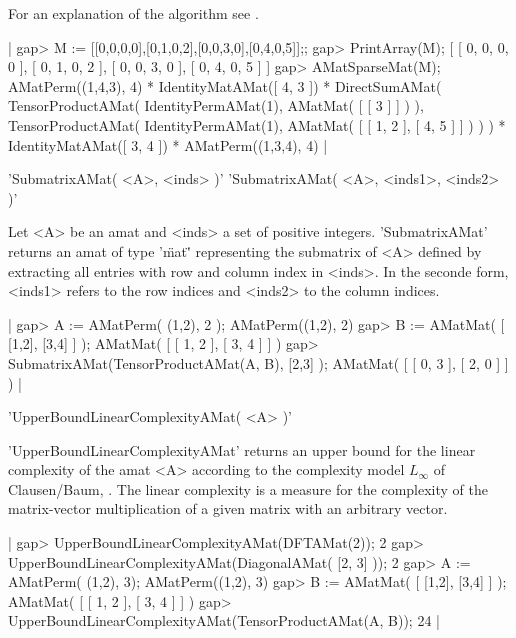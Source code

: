 For an explanation of the algorithm see \cite{Egn97}.

|    gap> M := [[0,0,0,0],[0,1,0,2],[0,0,3,0],[0,4,0,5]];; 
    gap> PrintArray(M);
    [ [  0,  0,  0,  0 ],
      [  0,  1,  0,  2 ],
      [  0,  0,  3,  0 ],
      [  0,  4,  0,  5 ] ]
    gap> AMatSparseMat(M);
    AMatPerm((1,4,3), 4) *
    IdentityMatAMat([ 4, 3 ]) *
    DirectSumAMat(
      TensorProductAMat(
        IdentityPermAMat(1),
        AMatMat(
          [ [ 3 ] ]
        )
      ),
      TensorProductAMat(
        IdentityPermAMat(1),
        AMatMat(
          [ [ 1, 2 ], [ 4, 5 ] ]
        )
      )
    ) *
    IdentityMatAMat([ 3, 4 ]) *
    AMatPerm((1,3,4), 4) |


'SubmatrixAMat( <A>, <inds> )'
'SubmatrixAMat( <A>, <inds1>, <inds2> )'

Let <A> be an amat and <inds> a set of positive integers. 
'SubmatrixAMat' returns an amat of type '\"mat\"' representing 
the submatrix of <A> defined by extracting all entries with
row and column index in <inds>. In the seconde form, <inds1>
refers to the row indices and <inds2> to the column indices.

|    gap> A := AMatPerm( (1,2), 2 );
    AMatPerm((1,2), 2)
    gap> B := AMatMat( [ [1,2], [3,4] ] );
    AMatMat(
      [ [ 1, 2 ], [ 3, 4 ] ]
    )
    gap> SubmatrixAMat(TensorProductAMat(A, B), [2,3] );
    AMatMat(
      [ [ 0, 3 ], [ 2, 0 ] ]
    ) |


'UpperBoundLinearComplexityAMat( <A> )'

'UpperBoundLinearComplexityAMat' returns an upper bound for the linear
complexity of the amat <A> according to the complexity model
$L_\infty$ of Clausen/Baum, \cite{CB93}. The linear complexity is
a measure for the complexity of the matrix-vector multiplication of a
given matrix with an arbitrary vector.

|    gap> UpperBoundLinearComplexityAMat(DFTAMat(2));
    2
    gap> UpperBoundLinearComplexityAMat(DiagonalAMat( [2, 3] ));
    2
    gap> A := AMatPerm( (1,2), 3);
    AMatPerm((1,2), 3)
    gap> B := AMatMat( [ [1,2], [3,4] ] );
    AMatMat(
      [ [ 1, 2 ], [ 3, 4 ] ]
    )
    gap> UpperBoundLinearComplexityAMat(TensorProductAMat(A, B));
    24 |

